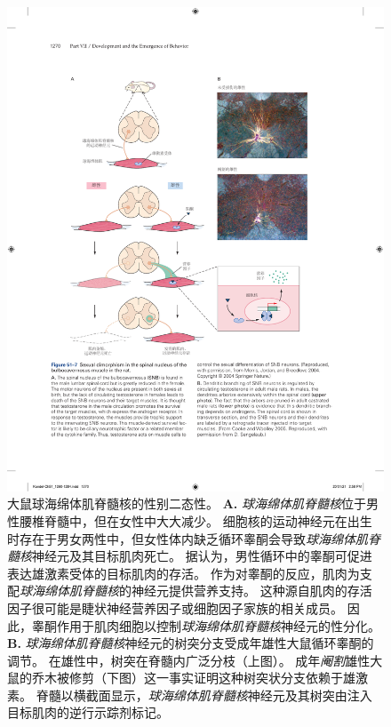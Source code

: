 \begin{figure}[htbp]
	\centering
	\includegraphics[width=1.0\linewidth]{chap51/fig_51_7}
	\caption{大鼠球海绵体肌脊髓核的性别二态性。
		\textbf{A.} \textit{球海绵体肌脊髓核}位于男性腰椎脊髓中，但在女性中大大减少。
		细胞核的运动神经元在出生时存在于男女两性中，但女性体内缺乏循环睾酮会导致\textit{球海绵体肌脊髓核}神经元及其目标肌肉死亡。
		据认为，男性循环中的睾酮可促进表达雄激素受体的目标肌肉的存活。
		作为对睾酮的反应，肌肉为支配\textit{球海绵体肌脊髓核}的神经元提供营养支持。
		这种源自肌肉的存活因子很可能是睫状神经营养因子或细胞因子家族的相关成员。
		因此，睾酮作用于肌肉细胞以控制\textit{球海绵体肌脊髓核}神经元的性分化\cite{morris2004sexual}。
		\textbf{B.} \textit{球海绵体肌脊髓核}神经元的树突分支受成年雄性大鼠循环睾酮的调节。
		在雄性中，树突在脊髓内广泛分枝（上图）。
		成年\textit{阉割}雄性大鼠的乔木被修剪（下图）这一事实证明这种树突状分支依赖于雄激素。
		脊髓以横截面显示，\textit{球海绵体肌脊髓核}神经元及其树突由注入目标肌肉的逆行示踪剂标记\cite{cooke2005gonadal}。}
	\label{fig:51_7}
\end{figure}


